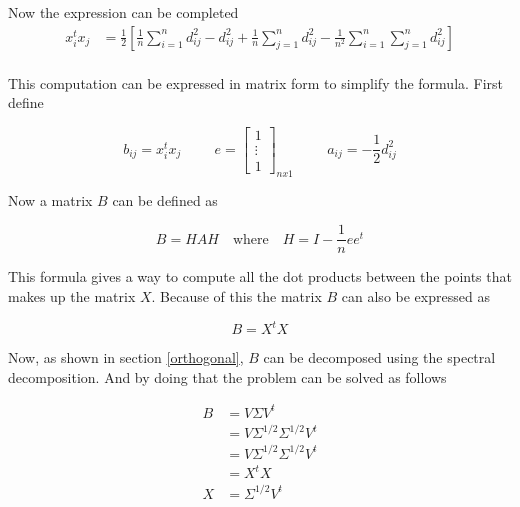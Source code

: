 \documentclass[12pt,journal]{IEEEtran}
\begin{document}
    Now the expression can be completed
    \begin{equation*}
        \begin{aligned}
            x_i^t x_j
            &=
            \frac{1}{2} \left[ \frac{1}{n} \sum_{i=1}^n d_{ij}^2 - d_{ij}^2 + \frac{1}{n} \sum_{j=1}^n d_{ij}^2 - \frac{1}{n^2}\sum_{i=1}^n \sum_{j=1}^n d_{ij}^2 \right]\\
        \end{aligned}
    \end{equation*}

    This computation can be expressed in matrix form to simplify the formula.
    First define

    \[
        b_{ij} = x_i^t x_j
        \hspace{1cm}
        e =
        \begin{bmatrix}
            1\\
            \vdots\\
            1
        \end{bmatrix}_{nx1}
        \hspace{1cm}
        a_{ij} = -\frac{1}{2} d_{ij}^2
    \]

    Now a matrix $B$ can be defined as

    \begin{equation*}
        B = H A H \quad \text{where} \quad H = I - \frac{1}{n} e e^t
    \end{equation*}

    This formula gives a way to compute all the dot products between the points
    that makes up the matrix $X$. Because of this the matrix $B$ can also
    be expressed as

    \begin{equation*}
        B = X^tX
    \end{equation*}

    Now, as shown in section \ref{orthogonal}, $B$ can be decomposed using the
    spectral decomposition. And by doing that the problem can be solved as follows

    \begin{equation*}
        \begin{aligned}
            B &= V \Sigma V^t\\
              &= V \Sigma^{1/2} \Sigma^{1/2} V^t\\
              &= V \Sigma^{1/2} \Sigma^{1/2} V^t\\
              &= X^t X\\
            X & = \Sigma^{1/2} V^t
        \end{aligned}
    \end{equation*}
\end{document}
